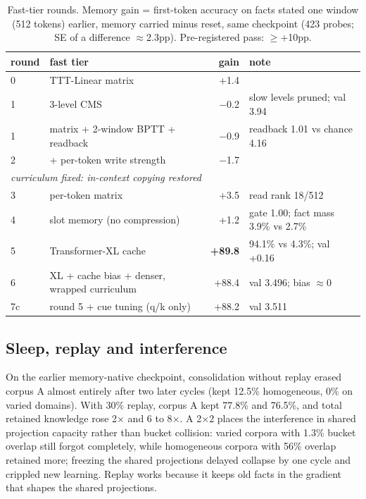 \documentclass[11pt]{article}
\begin{document}
\begin{table}[t]\centering\small
\caption{Fast-tier rounds. Memory gain = first-token accuracy on facts stated one
window (512 tokens) earlier, memory carried minus reset, same checkpoint
(423 probes; SE of a difference $\approx$2.3pp). Pre-registered pass: $\geq$+10pp.}
\label{tab:fast}
\begin{tabular}{llrl}\toprule
round & fast tier & gain & note\\\midrule
0 & TTT-Linear matrix & +1.4 & \\
1 & 3-level CMS & $-$0.2 & slow levels pruned; val 3.94\\
1 & matrix + 2-window BPTT + readback & $-$0.9 & readback 1.01 vs chance 4.16\\
2 & + per-token write strength & $-$1.7 & \\\midrule
\multicolumn{4}{l}{\emph{curriculum fixed: in-context copying restored}}\\
3 & per-token matrix & +3.5 & read rank 18/512\\
4 & slot memory (no compression) & +1.2 & gate 1.00; fact mass 3.9\% vs 2.7\%\\
5 & Transformer-XL cache & \textbf{+89.8} & 94.1\% vs 4.3\%; val +0.16\\
6 & XL + cache bias + denser, wrapped curriculum & +88.4 & val 3.496; bias $\approx$0\\
7c & round 5 + cue tuning (q/k only) & +88.2 & val 3.511\\\bottomrule
\end{tabular}\end{table}

\subsection{Sleep, replay and interference}\label{sec:interference}
On the earlier memory-native checkpoint, consolidation without replay erased
corpus A almost entirely after two later cycles (kept 12.5\% homogeneous, 0\%
on varied domains). With 30\% replay, corpus A kept 77.8\% and 76.5\%, and total
retained knowledge rose 2$\times$ and 6 to 8$\times$. A 2$\times$2 places the
interference in shared projection capacity rather than bucket collision: varied
corpora with 1.3\% bucket overlap still forgot completely, while homogeneous
corpora with 56\% overlap retained more; freezing the shared projections
delayed collapse by one cycle and crippled new learning. Replay works because
it keeps old facts in the gradient that shapes the shared projections.
\end{document}
